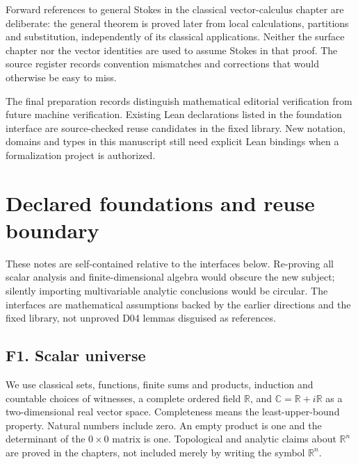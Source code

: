 \documentclass[11pt,oneside,openany]{book}
\theoremstyle{definition}
\theoremstyle{remark}
\newcounter{foundation}
\newcommand{\R}{\mathbb R}
\newcommand{\C}{\mathbb C}
\begin{document}
Forward references to general Stokes in the classical vector-calculus chapter
are deliberate: the general theorem is proved later from local calculations,
partitions and substitution, independently of its classical applications.
Neither the surface chapter nor the vector identities are used to assume
Stokes in that proof. The source register records convention mismatches and
corrections that would otherwise be easy to miss.

The final preparation records distinguish mathematical editorial verification
from future machine verification. Existing Lean declarations listed in the
foundation interface are source-checked reuse candidates in the fixed library.
New notation, domains and types in this manuscript still need explicit Lean
bindings when a formalization project is authorized.


\tableofcontents

\chapter*{Declared foundations and reuse boundary}
These notes are self-contained relative to the interfaces below. Re-proving all
scalar analysis and finite-dimensional algebra would obscure the new subject;
silently importing multivariable analytic conclusions would be circular.
The interfaces are mathematical assumptions backed by the earlier directions
and the fixed library, not unproved D04 lemmas disguised as references.

\section*{F1. Scalar universe}\label{base:real}
We use classical sets, functions, finite sums and products, induction and
countable choices of witnesses, a complete ordered field $\R$, and
$\C=\R+i\R$ as a two-dimensional real vector space. Completeness means the
least-upper-bound property. Natural numbers include zero. An empty product is
one and the determinant of the $0\times0$ matrix is one. Topological and analytic
claims about $\R^n$ are proved in the chapters, not included merely by writing
the symbol $\R^n$.
\end{document}
